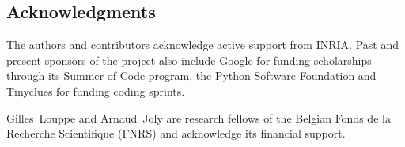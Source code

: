 \documentclass{llncs}
\DeclareRobustCommand{\VAN}[3]{#2}
\begin{document}
\subsection*{Acknowledgments}

The authors and contributors acknowledge active support from INRIA\@. Past and
present sponsors of the project also include Google for funding
scholarships through its Summer of Code program,
the Python Software Foundation and Tinyclues for funding coding sprints.

Gilles~Louppe and Arnaud~Joly are research fellows of the Belgian
Fonds de la Recherche Scientifique (FNRS)
and acknowledge its financial support.

{\small

\DeclareRobustCommand{\VAN}[3]{#3}

}
\end{document}
